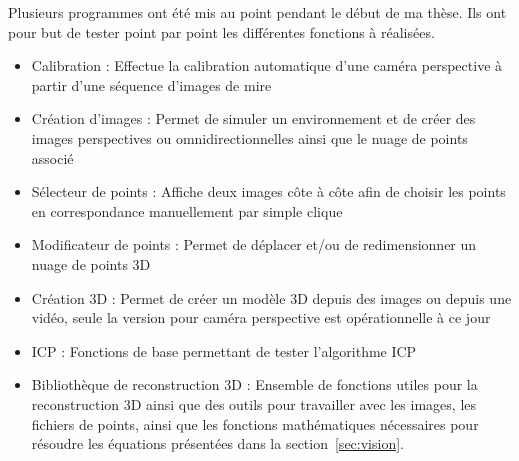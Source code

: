 Plusieurs programmes ont été mis au point pendant le début de ma thèse.
Ils ont pour but de tester point par point les différentes fonctions à réalisées.
\begin{itemize}
\item Calibration : Effectue la calibration automatique d'une caméra perspective à partir d'une séquence d'images de mire
\item Création d'images :  Permet de simuler un environnement et de créer des images perspectives ou omnidirectionnelles ainsi que le nuage de points associé
\item Sélecteur de points : Affiche deux images côte à côte afin de choisir les points en correspondance manuellement par simple clique
\item Modificateur de points : Permet de déplacer et/ou de redimensionner un nuage de points 3D
\item Création 3D : Permet de créer un modèle 3D depuis des images ou depuis une vidéo, seule la version pour caméra perspective est opérationnelle à ce jour
\item ICP : Fonctions de base permettant de tester l'algorithme ICP
\item Bibliothèque de reconstruction 3D : Ensemble de fonctions utiles pour la reconstruction 3D ainsi que des outils pour travailler avec les images, les fichiers de points, ainsi que les fonctions mathématiques nécessaires pour résoudre les équations présentées dans la section~\ref{sec:vision}.
\end{itemize}


